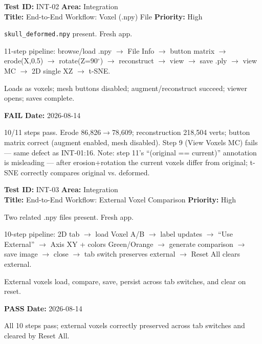 \documentclass[12pt,a4paper]{article}
\newcommand{\pass}{\textcolor{paleogreen}{\textbf{PASS}}}
\newcommand{\fail}{\textcolor{paleored}{\textbf{FAIL}}}
\newcommand{\testheader}[4]{%
  \smallskip
  \noindent\textbf{Test ID:} #1 \hfill \textbf{Area:} #2 \\
  \textbf{Title:} #3 \hfill \textbf{Priority:} #4
}
\newenvironment{testbody}{%
  \begin{description}[leftmargin=2em,style=nextline]
}{%
  \end{description}
  \smallskip
}
\begin{document}
\testheader{INT-02}{Integration}{End-to-End Workflow: Voxel (.npy) File}{High}
\begin{testbody}
  \item[\textbf{Preconditions:}] \texttt{skull\_deformed.npy} present. Fresh
        app.
  \item[\textbf{Steps:}] 11-step pipeline: browse/load .npy $\rightarrow$ File
        Info $\rightarrow$ button matrix $\rightarrow$ erode(X,0.5)
        $\rightarrow$ rotate(Z=90$^\circ$) $\rightarrow$ reconstruct
        $\rightarrow$ view $\rightarrow$ save .ply $\rightarrow$ view MC
        $\rightarrow$ 2D single XZ $\rightarrow$ t-SNE.
  \item[\textbf{Expected Result:}] Loads as voxels; mesh buttons disabled;
        augment/reconstruct succeed; viewer opens; saves complete.
  \item[\textbf{Status:}] \fail{} \hspace{1em} \textbf{Date:} 2026-08-14
  \item[\textbf{Notes:}] 10/11 steps pass. Erode 86,826$\rightarrow$78,609;
        reconstruction 218,504 verts; button matrix correct (augment enabled,
        mesh disabled). Step 9 (View Voxels MC) fails --- same defect as
        INT-01:16. Note: step 11's ``(original == current)'' annotation is
        misleading --- after erosion+rotation the current voxels differ from
        original; t-SNE correctly compares original vs. deformed.
\end{testbody}

\testheader{INT-03}{Integration}{End-to-End Workflow: External Voxel Comparison}{High}
\begin{testbody}
  \item[\textbf{Preconditions:}] Two related .npy files present. Fresh app.
  \item[\textbf{Steps:}] 10-step pipeline: 2D tab $\rightarrow$ load Voxel A/B
        $\rightarrow$ label updates $\rightarrow$ ``Use External'' $\rightarrow$
        Axis XY + colors Green/Orange $\rightarrow$ generate comparison
        $\rightarrow$ save image $\rightarrow$ close $\rightarrow$ tab switch
        preserves external $\rightarrow$ Reset All clears external.
  \item[\textbf{Expected Result:}] External voxels load, compare, save, persist
        across tab switches, and clear on reset.
  \item[\textbf{Status:}] \pass{} \hspace{1em} \textbf{Date:} 2026-08-14
  \item[\textbf{Notes:}] All 10 steps pass; external voxels correctly
        preserved across tab switches and cleared by Reset All.
\end{testbody}
\end{document}
